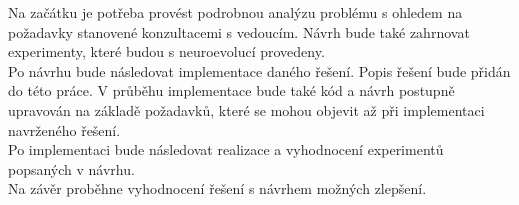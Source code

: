 Na začátku je potřeba provést podrobnou analýzu problému s ohledem na požadavky stanovené konzultacemi s vedoucím. Návrh bude také zahrnovat experimenty, které budou s neuroevolucí provedeny. \\
Po návrhu bude následovat implementace daného řešení. Popis řešení bude přidán do této práce. V průběhu implementace bude také kód a návrh postupně upravován na základě požadavků, které se mohou objevit až při implementaci navrženého řešení. \\
Po implementaci bude následovat realizace a vyhodnocení experimentů popsaných v návrhu. \\
Na závěr proběhne vyhodnocení řešení s návrhem možných zlepšení.